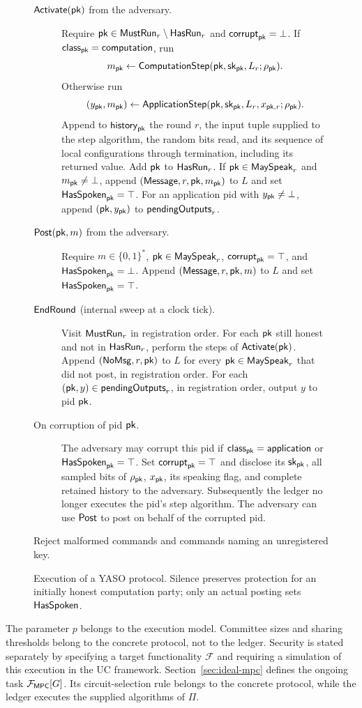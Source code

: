 \begin{figure}[p]
{\begin{minipage}{0.95\textwidth}
\begin{description}
\item[$\mathsf{Activate}(\mathsf{pk})$ from the adversary.]
  Require $\mathsf{pk}\in \mathsf{MustRun}_r\setminus \mathsf{HasRun}_r$ and $\mathsf{corrupt}_{\mathsf{pk}}=\bot$.
  If $\mathsf{class}_{\mathsf{pk}}=\mathsf{computation}$, run
  \[
    m_{\mathsf{pk}}\gets\mathsf{ComputationStep}(\mathsf{pk},\mathsf{sk}_{\mathsf{pk}},L_r;\rho_{\mathsf{pk}}).
  \]
  Otherwise run
  \[
    (y_{\mathsf{pk}},m_{\mathsf{pk}})\gets\mathsf{ApplicationStep}(\mathsf{pk},\mathsf{sk}_{\mathsf{pk}},L_r,x_{\mathsf{pk},r};\rho_{\mathsf{pk}}).
  \]
  Append to $\mathsf{history}_{\mathsf{pk}}$ the round $r$, the input tuple supplied to
  the step algorithm, the random bits read, and its sequence of local
  configurations through termination, including its returned value.
  Add $\mathsf{pk}$ to $\mathsf{HasRun}_r$.
  If $\mathsf{pk}\in \mathsf{MaySpeak}_r$ and $m_{\mathsf{pk}}\neq\bot$, append
  $(\mathsf{Message},r,\mathsf{pk},m_{\mathsf{pk}})$ to $L$ and set $\mathsf{HasSpoken}_{\mathsf{pk}}=\top$.
  For an application pid with $y_{\mathsf{pk}}\neq\bot$, append $(\mathsf{pk},y_{\mathsf{pk}})$
  to $\mathsf{pendingOutputs}_r$.

\item[$\mathsf{Post}(\mathsf{pk},m)$ from the adversary.]
  Require $m\in\{0,1\}^*$, $\mathsf{pk}\in \mathsf{MaySpeak}_r$, $\mathsf{corrupt}_{\mathsf{pk}}=\top$,
  and $\mathsf{HasSpoken}_{\mathsf{pk}}=\bot$.
  Append $(\mathsf{Message},r,\mathsf{pk},m)$ to $L$ and set $\mathsf{HasSpoken}_{\mathsf{pk}}=\top$.

\item[$\mathsf{EndRound}$ (internal sweep at a clock tick).]
  Visit $\mathsf{MustRun}_r$ in registration order.  For each $\mathsf{pk}$ still honest and
  not in $\mathsf{HasRun}_r$, perform the steps of $\mathsf{Activate}(\mathsf{pk})$.
  Append $(\mathsf{NoMsg},r,\mathsf{pk})$ to $L$ for every $\mathsf{pk}\in \mathsf{MaySpeak}_r$ that did not
  post, in registration order.
  For each $(\mathsf{pk},y)\in\mathsf{pendingOutputs}_r$, in registration order,
  output $y$ to pid $\mathsf{pk}$.

\item[On corruption of pid $\mathsf{pk}$.]
  The adversary may corrupt this pid if $\mathsf{class}_{\mathsf{pk}}=\mathsf{application}$ or
  $\mathsf{HasSpoken}_{\mathsf{pk}}=\top$.  Set $\mathsf{corrupt}_{\mathsf{pk}}=\top$ and disclose its
  $\mathsf{sk}_{\mathsf{pk}}$, all sampled bits of $\rho_{\mathsf{pk}}$, $x_{\mathsf{pk}}$, its speaking
  flag, and complete retained history to the adversary.
  Subsequently the ledger no longer executes the pid's step algorithm.
  The adversary can use $\mathsf{Post}$ to post on behalf of the corrupted pid.
\end{description}
Reject malformed commands and commands naming an
unregistered key.
\end{minipage}}
\caption{Execution of a YASO protocol.  Silence preserves protection for
an initially honest computation party; only an actual posting sets
$\mathsf{HasSpoken}$.}
\label{fig:yaso-ledger}
\end{figure}

The parameter $p$ belongs to the execution model.  Committee sizes and
sharing thresholds belong to the concrete protocol, not to the ledger.
Security is stated separately by specifying a target functionality
$\mathcal F$ and requiring a simulation of this execution in the UC
framework.  Section~\ref{sec:ideal-mpc} defines the ongoing task
$\mathcal F_{\mathsf{MPC}}[G]$.  Its circuit-selection rule belongs to the concrete
protocol, while the ledger executes the supplied algorithms of $\Pi$.

